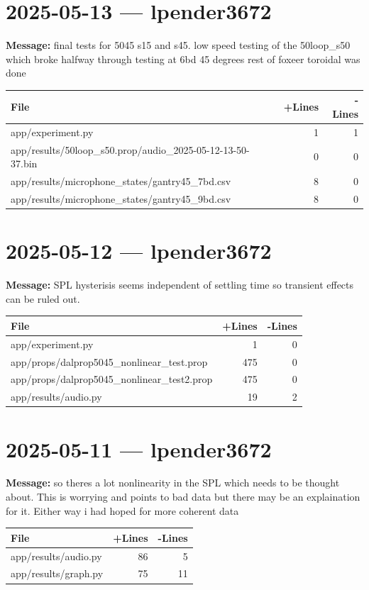 \documentclass{article}
\begin{document}
\section*{2025-05-13 --- lpender3672}
\textbf{Message:} final tests for 5045 s15 and s45. low speed testing of the 50loop\_s50 which broke halfway through testing at 6bd 45 degrees rest of foxeer toroidal was done

\begin{longtable}{|p{10cm}|r|r|}
\hline \textbf{File} & \textbf{+Lines} & \textbf{-Lines} \\
\hline
app/experiment.py & 1 & 1 \\
\hline
app/results/50loop\_s50.prop/audio\_2025-05-12-13-50-37.bin & 0 & 0 \\
\hline
app/results/microphone\_states/gantry45\_7bd.csv & 8 & 0 \\
\hline
app/results/microphone\_states/gantry45\_9bd.csv & 8 & 0 \\
\hline
\end{longtable}

\section*{2025-05-12 --- lpender3672}
\textbf{Message:} SPL hysterisis seems independent of settling time so transient effects can be ruled out.

\begin{longtable}{|p{10cm}|r|r|}
\hline \textbf{File} & \textbf{+Lines} & \textbf{-Lines} \\
\hline
app/experiment.py & 1 & 0 \\
\hline
app/props/dalprop5045\_nonlinear\_test.prop & 475 & 0 \\
\hline
app/props/dalprop5045\_nonlinear\_test2.prop & 475 & 0 \\
\hline
app/results/audio.py & 19 & 2 \\
\hline
\end{longtable}

\section*{2025-05-11 --- lpender3672}
\textbf{Message:} so theres a lot nonlinearity in the SPL which needs to be thought about. This is worrying and points to bad data but there may be an explaination for it. Either way i had hoped for more coherent data

\begin{longtable}{|p{10cm}|r|r|}
\hline \textbf{File} & \textbf{+Lines} & \textbf{-Lines} \\
\hline
app/results/audio.py & 86 & 5 \\
\hline
app/results/graph.py & 75 & 11 \\
\hline
\end{longtable}
\end{document}
